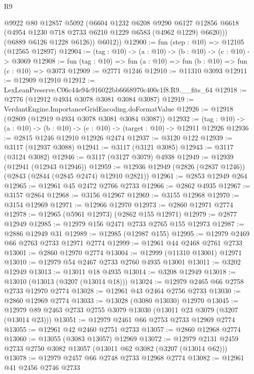 \begin{lexlean}{R9}
\begin{coremodule}
            @9922
            @80
            @12857
            @5092
            (@6604
              @1232
              @6208
              @9290
              @6127
              @12856
              @6618
              (@4954 @1230 @718 @2733 @6210 @1229 @6583 (@4962 @1229) @6620)))
          (@6889 @6126 @1228 @6126))
        @6012))
@12900 := fun (step : @10) => @12105 (@12565 @12897)
@12904 := (tag : @10) -> (a : @10) -> (b : @10) -> (c : @10) -> @3069
@12908 := fun (tag : @10) => fun (a : @10) => fun (b : @10) => fun (c : @10) => @3073
@12909 := @2771 @1246
@12910 := @11310 @3093
@12911 := @12909 @12910
@12912 := LexLeanPreserve.C06c44e94c916022bb6668970c400c1f8.R9.__fits_64
@12918 := @2776 (@12912 @4934 @3078 @3081 @3084 @3087)
@12919 := VerdantEngine.ImportanceGridEncoding.doFormatValue
@12926 := @12918 (@2809 (@12919 @4934 @3078 @3081 @3084 @3087))
@12932 := (tag : @10) -> (a : @10) -> (b : @10) -> (c : @10) -> (target : @10) -> @12911 @12926
@12936 := @2815 @1246 @12910 @12926 @2474
@12937 := @3120 @122
@12939 := @3117 (@12937 @3088)
@12941 := @3117 (@3121 @3085)
@12943 := @3117 (@3124 @3082)
@12946 := @3117 (@3127 @3079) @4938
@12949 := @12939 (@12941 (@12943 @12946))
@12959 := @12936 @12949 (@2826 (@2837 @1246)) (@2843 (@2844 (@2845 @2474) @12910 @2821))
@12961 := @2853 @12949 @264
@12965 := @12961 @45 @2472 @2766 @2733
@12966 := @2862 @4935
@12967 := @3157 @2864
@12968 := @3156 @12967
@12969 := @3155 @12968
@12970 := @3154 @12969
@12971 := @12966 @12970
@12973 := @2860 @12971 @2774
@12978 := @12965 (@5961 @12973) (@2862 @155 @12971)
@12979 := @2877 @12949
@12985 := @12979 @156 @2471 @2733 @2765 @155 @12973
@12987 := @2886 @12949 @31
@12989 := @12985 (@12987 @155)
@12995 := @12979 @2469 @66 @2763 @2733 @12971 @2774
@12999 := @12961 @44 @2468 @2761 @2733
@13001 := @2860 @12970 @2774
@13004 := @12999 (@11310 @13001) @12971
@13010 := @12979 @54 @2467 @2733 @2760 @4935 @13001
@13011 := @3202 @12949
@13013 := @13011 @18 @4935
@13014 := @3208 @12949
@13018 := @13010 (@13013 (@3207 (@13014 @18)))
@13024 := @12979 @2465 @66 @2758 @2733 @12970 @2774
@13028 := @12961 @43 @2464 @2756 @2733
@13030 := @2860 @12969 @2774
@13033 := @13028 (@3080 @13030) @12970
@13045 := @12979 @89 @2463 @2733 @2755 @3079 @13030 (@13011 @23 @3079 (@3207 (@13014 @23)))
@13051 := @12979 @2461 @66 @2753 @2733 @12969 @2774
@13055 := @12961 @42 @2460 @2751 @2733
@13057 := @2860 @12968 @2774
@13060 := @13055 (@3083 @13057) @12969
@13072 := @12979 @2131 @2459 @2733 @2750 @3082 @13057 (@13011 @62 @3082 (@3207 (@13014 @62)))
@13078 := @12979 @2457 @66 @2748 @2733 @12968 @2774
@13082 := @12961 @41 @2456 @2746 @2733

\end{coremodule}
\end{lexlean}

